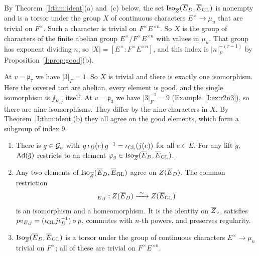 \begin{example}\label{I:ex:iso}
By Theorem~\ref{I:thm:ident}(a) and~(c) below, the set $\operatorname{Iso}_{\overline{Z}}(\overline{E}_D,\overline{E}_{\mathrm{GL}})$ is nonempty and is a torsor under the group $X$ of continuous characters $E^\times\to\mu_n$ that are trivial on $F^\times$. Such a character is trivial on $F^\times E^{\times n}$. So $X$ is the group of characters of the finite abelian group $E^\times/F^\times E^{\times n}$ with values in $\mu_n$. That group has exponent dividing $n$, so $|X|=[E^\times:F^\times E^{\times n}]$, and this index is $|n|_F^{-(r-1)}$ by Proposition~\ref{I:prop:good}(b).

At $v=\mathfrak p_7$ we have $|3|_F=1$. So $X$ is trivial and there is exactly one isomorphism. Here the covered tori are abelian, every element is good, and the single isomorphism is $\jj_{E,j}$ itself. At $v=\mathfrak p_3$ we have $|3|_F^{-1}=9$ (Example~\ref{I:ex:r2n3}), so there are nine isomorphisms. They differ by the nine characters in $X$. By Theorem~\ref{I:thm:ident}(b) they all agree on the good elements, which form a subgroup of index $9$.
\end{example}


\begin{theorem}\label{I:thm:ident}
\begin{enumerate}[label=(\alph*)]
\item There is $g\in\mathcal{G}_v$ with $g\,\iota_D(e)\,g^{-1}=\iota_{\mathrm{GL}}(j(e))$ for all $e\in E$. For any lift $\tilde g$, $\operatorname{Ad}(\tilde g)$ restricts to an element $\varphi_g\in\operatorname{Iso}_{\overline{Z}}(\overline{E}_D,\overline{E}_{\mathrm{GL}})$.
\item Any two elements of $\operatorname{Iso}_{\overline{Z}}(\overline{E}_D,\overline{E}_{\mathrm{GL}})$ agree on $Z(\overline{E}_D)$. The common restriction
\[ \jj_{E,j}:Z(\Eb_D)\xrightarrow{\ \sim\ }Z(\Eb_{\GL}) \]
is an isomorphism and a homeomorphism. It is the identity on $\overline{Z}_v$, satisfies $p\circ\relax_{E,j}=(\iota_{\mathrm{GL}} j\iota_D^{-1})\circ p$, commutes with $n$-th powers, and preserves regularity.
\item $\operatorname{Iso}_{\overline{Z}}(\overline{E}_D,\overline{E}_{\mathrm{GL}})$ is a torsor under the group of continuous characters $E^\times\to\mu_n$ trivial on $F^\times$; all of these are trivial on $F^\times E^{\times n}$.
\end{enumerate}
\end{theorem}

